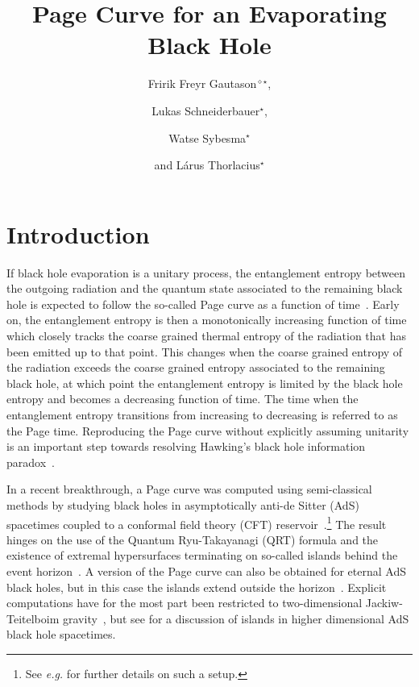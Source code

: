 \documentclass[12pt,a4paper]{article}
\title{Page Curve for an Evaporating Black Hole}
\author{\footnotesize{F}ri{\dh}rik Freyr Gautason$^{\diamond\star}$,}
\author{Lukas Schneiderbauer$^{\star}$,}
\author{Watse Sybesma$^{\star}$}
\author{and L\'{a}rus Thorlacius$^{\star}$}
\affiliation{$^{\diamond}$Instituut voor Theoretische Fysica, KU Leuven\\
Celestijnenlaan 200D, 3001 Leuven, Belgium}
\affiliation{$^{\star}$Science Institute
                                           University of Iceland \\Dunhaga 3, 107 Reykjav\'{i}k, Iceland.}
\begin{document}
\maketitle

\section{Introduction}
If black hole evaporation is a unitary process, the entanglement entropy between the outgoing radiation and the quantum state associated to the remaining black hole is expected to follow the so-called Page curve as a function of time~\cite{Page:1993wv,Page:2013dx}. Early on, the entanglement entropy is then a monotonically increasing function of time which closely tracks the coarse grained thermal entropy of the radiation that has been emitted up to that point. This changes when the coarse grained entropy of the radiation exceeds the coarse grained entropy associated to the remaining black hole, at which point the entanglement entropy is limited by the black hole entropy and becomes a decreasing function of time. The time when the entanglement entropy transitions from increasing to decreasing is referred to as the Page time. Reproducing the Page curve without explicitly assuming unitarity is an important step towards resolving Hawking's black hole information paradox~\cite{Hawking:1976aa}.

In a recent breakthrough, a Page curve was computed using semi-classical methods  by studying black holes in asymptotically anti-de Sitter (AdS) spacetimes coupled to a conformal field theory (CFT) reservoir~\cite{Penington:2019npb,Almheiri:2019psf}.\footnote{See {\it e.g.} \cite{Rocha:2008fe} for further details on such a setup.} The result hinges on the use of the Quantum Ryu-Takayanagi (QRT) formula \cite{Ryu:2006bv,Hubeny:2007xt,Faulkner:2013ana,Engelhardt:2014gca} and the existence of extremal hypersurfaces terminating on so-called islands behind the event horizon~\cite{Almheiri:2019hni}. A version of the Page curve can also be obtained for eternal AdS black holes, but in this case the islands extend outside the horizon~\cite{Almheiri:2019yqk}. Explicit computations have for the most part been restricted to two-dimensional Jackiw-Teitelboim gravity~\cite{Almheiri:2019psf,Almheiri:2019hni}, but see \cite{Almheiri:2019psy} for a discussion of islands in higher dimensional AdS black hole spacetimes. 
\end{document}
